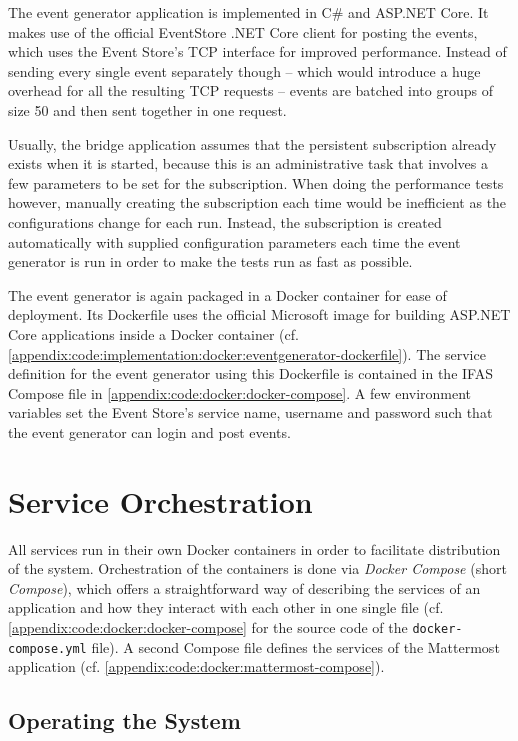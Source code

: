 The event generator application is implemented in C\# and ASP.NET Core.
It makes use of the official EventStore .NET Core client for posting the events, which uses the Event Store's \ac{TCP} interface for improved performance.
Instead of sending every single event separately though -- which would introduce a huge overhead for all the resulting \ac{TCP} requests -- events are batched into groups of size 50 and then sent together in one request.

Usually, the bridge application assumes that the persistent subscription already exists when it is started, because this is an administrative task that involves a few parameters to be set for the subscription.
When doing the performance tests however, manually creating the subscription each time would be inefficient as the configurations change for each run.
Instead, the subscription is created automatically with supplied configuration parameters each time the event generator is run in order to make the tests run as fast as possible.

The event generator is again packaged in a Docker container for ease of deployment.
Its Dockerfile uses the official Microsoft image for building ASP.NET Core applications inside a Docker container (cf. \cref{appendix:code:implementation:docker:eventgenerator-dockerfile}).
The service definition for the event generator using this Dockerfile is contained in the \ac{IFAS} Compose file in \cref{appendix:code:docker:docker-compose}.
A few environment variables set the Event Store's service name, username and password such that the event generator can login and post events.

\section{Service Orchestration}
\label{sec:implementation:orchestration}

All services run in their own Docker containers in order to facilitate distribution of the system.
Orchestration of the containers is done via \emph{Docker Compose} (short \emph{Compose}), which offers a straightforward way of describing the services of an application and how they interact with each other in one single file (cf. \cref{appendix:code:docker:docker-compose} for the source code of the \texttt{docker-compose.yml} file).
A second Compose file defines the services of the Mattermost application (cf. \cref{appendix:code:docker:mattermost-compose}).

\subsection{Operating the System}

